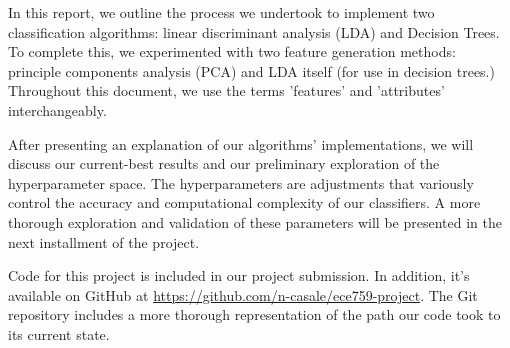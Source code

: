 In this report, we outline the process we undertook to implement two classification algorithms: linear discriminant analysis (LDA) and Decision Trees. To complete this, we experimented with two feature generation methods: principle components analysis (PCA) and LDA itself (for use in decision trees.) Throughout this document, we use the terms 'features' and 'attributes' interchangeably.

After presenting an explanation of our algorithms' implementations, we will discuss our current-best results and our preliminary exploration of the hyperparameter space. The hyperparameters are adjustments that variously control the accuracy and computational complexity of our classifiers. A more thorough exploration and validation of these parameters will be presented in the next installment of the project.

Code for this project is included in our project submission. In addition, it's available on GitHub at \href{https://github.com/n-casale/ece759-project}{https://github.com/n-casale/ece759-project}. The Git repository includes a more thorough representation of the path our code took to its current state. 